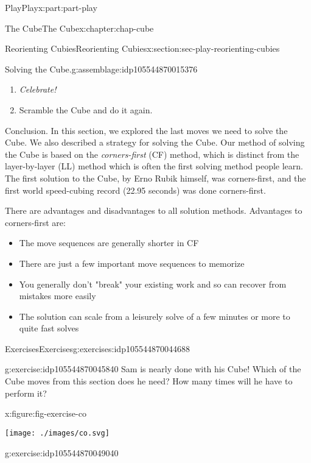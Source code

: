 \documentclass[oneside,10pt,]{book}
\numberwithin{equation}{section}
\begin{document}
\begin{partptx}{Play}{}{Play}{}{}{x:part:part-play}
\begin{chapterptx}{The Cube}{}{The Cube}{}{}{x:chapter:chap-cube}
\begin{sectionptx}{Reorienting Cubies}{}{Reorienting Cubies}{}{}{x:section:sec-play-reorienting-cubies}
\begin{assemblage}{Solving the Cube.}{g:assemblage:idp105544870015376}
\begin{enumerate}
\item{}\emph{Celebrate!}%
\item{}Scramble the Cube and do it again.%
\end{enumerate}
%
\end{assemblage}
\begin{conclusion}{Conclusion.}%
In this section, we explored the last moves we need to solve the Cube. We also described a strategy for solving the Cube. Our method of solving the Cube is based on the \emph{corners-first} (CF) method, which is distinct from the layer-by-layer (LL) method which is often the first solving method people learn. The first solution to the Cube, by Erno Rubik himself, was corners-first, and the first world speed-cubing record (22.95 seconds) was done corners-first.%
\par
There are advantages and disadvantages to all solution methods. Advantages to corners-first are:%
\begin{itemize}[label=\textbullet]
\item{}The move sequences are generally shorter in CF%
\item{}There are just a few important move sequences to memorize%
\item{}You generally don't "break" your existing work and so can recover from mistakes more easily%
\item{}The solution can scale from a leisurely solve of a few minutes or more to quite fast solves%
\end{itemize}
%
\end{conclusion}%
%
%
\typeout{************************************************}
\typeout{************************************************}
%
\begin{exercises-subsection-numberless}{Exercises}{}{Exercises}{}{}{g:exercises:idp105544870044688}
\begin{divisionexercise}{1}{}{}{g:exercise:idp105544870045840}%
Sam is nearly done with his Cube! Which of the Cube moves from this section does he need? How many times will he have to perform it?%
\begin{figureptx}{}{x:figure:fig-exercise-co}{}%
\begin{image}{0.25}{0.5}{0.25}%
\texttt{[image: ./images/co.svg]}
\end{image}%
\tcblower
\end{figureptx}%
\end{divisionexercise}%
\begin{divisionexercise}{2}{}{}{g:exercise:idp105544870049040}%

\end{divisionexercise}
\end{exercises-subsection-numberless}
\end{sectionptx}
\end{chapterptx}
\end{partptx}
\end{document}
